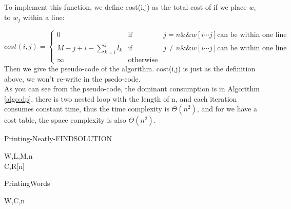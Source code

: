 \documentclass[oneside]{homework} %
\begin{document}
\begin{text}
  \noindent To implement this function, we define cost(i,j) as the total cost of if we place $w_{i}$ to $w_{j}$ within a line:
\end{text}
\begin{equation}
cost(i,j) = \left\{
             \begin{array}{lcl}
			   {0} &\text{if}& j=n \&\& w[i \cdots j]\text{can be within one line} \\
			   {M-j+i-\sum_{k=i}^{j}l_{k}} &\text{if}& j\neq n \&\& w[i \cdots j]\text{can be within one line} \\
			   {\infty} &\text{otherwise} 
             \end{array}  
        \right.
\end {equation}
Then we give the pseudo-code of the algorithm. cost(i,j) is just as the definition above, we won't re-write in the psedo-code.
\\ As you can see from the pseudo-code, the dominant consumption is in Algorithm \ref{algo:dp}, there is two nested loop with the length of n, and each iteration consumes constant time, thus the time complexity is $\Theta(n^{2})$, and for we have a cost table, the space complexity is also $\Theta(n^{2})$.

\begin{algorithm}[h]
  \caption{Printing-Neatly-FINDSOLUTION}
  \label{algo:dp}
  \begin{algorithmic}[1]
	\REQUIRE W,L,M,n
	\ENSURE ~ ~\\ 
	\ENDFOR
		\ELSE
		\ENDIF
	  \ENDFOR
	\ENDFOR
	  \ELSE
	  \ENDIF
	\ENDFOR
		\ENDIF
	  \ENDFOR
	\ENDFOR
	\LASTCON C,R[n]
  \end{algorithmic}
\end{algorithm}

\begin{algorithm}[h]
  \caption{PrintingWords}
  \label{algo:print}
  \begin{algorithmic}[1]
	\REQUIRE W,C,n
	\ENSURE ~ ~\\ 
	\ENDWHILE
	  \ENDFOR
	\ENDFOR
  \end{algorithmic}
\end{algorithm}
\end{document}
